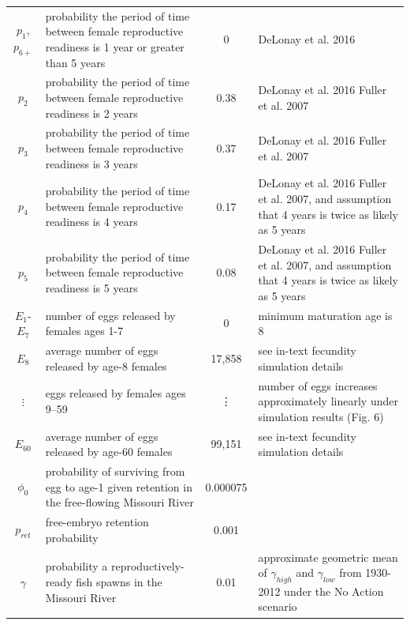 \documentclass[12pt]{article}
\begin{document}
\begin{longtable}{cp{5.5cm}cp{5cm}}
$p_1$, $p_{6+}$ & probability the period of time between female reproductive readiness is 1 year or greater than 5 years \newline & 0 & DeLonay et al. 2016\\
$p_2$ & probability the period of time between female reproductive readiness is 2 years \newline & 0.38 & DeLonay et al. 2016 \newline Fuller et al. 2007\\
$p_3$ & probability the period of time between female reproductive readiness is 3 years \newline & 0.37 & DeLonay et al. 2016 \newline Fuller et al. 2007\\
$p_4$ & probability the period of time between female reproductive readiness is 4 years \newline & 0.17 & DeLonay et al. 2016 \newline Fuller et al. 2007, and \newline assumption that 4 years is twice as likely as 5 years \newline\\
$p_5$ & probability the period of time between female reproductive readiness is 5 years \newline & 0.08 & DeLonay et al. 2016 \newline Fuller et al. 2007, and \newline assumption that 4 years is twice as likely as 5 years\newline\\
$E_{1}$-$E_7$ & number of eggs released by females ages 1-7 \newline & 0 & minimum maturation age is 8\\
$E_8$ & average number of eggs released by age-8 females \newline & 17,858 & see in-text fecundity simulation details\\
$\vdots$ & eggs released by females ages 9--59 \newline & \vdots & number of eggs increases approximately linearly under simulation results (Fig. 6) \newline \\
$E_{60}$ & average number of eggs released by age-60 females \newline & 99,151 & see in-text fecundity simulation details\\
$\phi_{0}$ & probability of surviving from egg to age-1 given retention in the free-flowing Missouri River \newline & 0.000075 & \\
$p_{ret}$ & free-embryo retention probability\newline & 0.001 & \\
$\gamma$ & probability a reproductively-ready fish spawns in the Missouri River \newline & 0.01 & approximate geometric \newline mean of $\gamma_{high}$ and $\gamma_{low}$ from 1930-2012 under the No Action scenario\\
\hline
\end{longtable}
\end{document}

